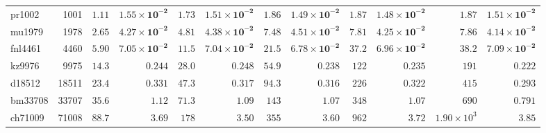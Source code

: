 \begin{table}[t]
{\begin{tabular}{@{}lr*{5}{rr}@{}}
pr1002 & 1001 & $1.11$ & $\mathbf{1.55 \times 10^{-2}}$ & $1.73$ & $\mathbf{1.51 \times 10^{-2}}$ & $1.86$ & $\mathbf{1.49 \times 10^{-2}}$ & $1.87$ & $\mathbf{1.48 \times 10^{-2}}$ & $1.87$ & $\mathbf{1.51 \times 10^{-2}}$ \\
mu1979 & 1978 & $2.65$ & $\mathbf{4.27 \times 10^{-2}}$ & $4.81$ & $\mathbf{4.38 \times 10^{-2}}$ & $7.48$ & $\mathbf{4.51 \times 10^{-2}}$ & $7.81$ & $\mathbf{4.25 \times 10^{-2}}$ & $7.86$ & $\mathbf{4.14 \times 10^{-2}}$ \\
fnl4461 & 4460 & $5.90$ & $\mathbf{7.05 \times 10^{-2}}$ & $11.5$ & $\mathbf{7.04 \times 10^{-2}}$ & $21.5$ & $\mathbf{6.78 \times 10^{-2}}$ & $37.2$ & $\mathbf{6.96 \times 10^{-2}}$ & $38.2$ & $\mathbf{7.09 \times 10^{-2}}$ \\
kz9976 & 9975 & $14.3$ & $\mathbf{0.244}$ & $28.0$ & $\mathbf{0.248}$ & $54.9$ & $\mathbf{0.238}$ & $122$ & $\mathbf{0.235}$ & $191$ & $\mathbf{0.222}$ \\
d18512 & 18511 & $23.4$ & $\mathbf{0.331}$ & $47.3$ & $\mathbf{0.317}$ & $94.3$ & $\mathbf{0.316}$ & $226$ & $\mathbf{0.322}$ & $415$ & $\mathbf{0.293}$ \\
bm33708 & 33707 & $35.6$ & $\mathbf{1.12}$ & $71.3$ & $\mathbf{1.09}$ & $143$ & $\mathbf{1.07}$ & $348$ & $\mathbf{1.07}$ & $690$ & $\mathbf{0.791}$ \\
ch71009 & 71008 & $88.7$ & $\mathbf{3.69}$ & $178$ & $\mathbf{3.50}$ & $355$ & $\mathbf{3.60}$ & $962$ & $\mathbf{3.72}$ & $1.90 \times 10^{3}$ & $\mathbf{3.85}$ \\
\bottomrule
\end{tabular}%
}
\end{table}
